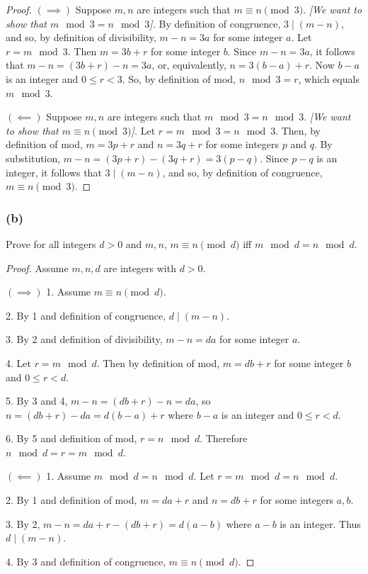 \documentclass[14pt]{extarticle}
\begin{document}
\begin{proof}
\(\bm{(\implies)}\) Suppose $m, n$ are integers such that \(m \equiv n \pmod 3\). {\it [We want to show that \(m \mod 
3 = n \mod 3\)].} By definition of congruence, \(3 \mid (m-n)\), and so, by definition of divisibility, \(m - n = 3a\) 
for some integer $a$. Let \(r = m \mod 3\). Then \(m = 3b + r\) for some integer $b$. Since \(m - n = 3a\), it follows 
that \(m - n = (3b + r) - n = 3a\), or, equivalently, \(n = 3(b - a) + r\). Now \(b - a\) is an integer and \(0 \leq r 
< 3\). So, by definition of mod, \(n \mod 3 = r\), which equals \(m \mod 3\). 

\(\bm{(\impliedby)}\) Suppose $m, n$ are integers such that \(m \mod 3 = n \mod 3\). {\it [We want to show that \(m 
\equiv n \pmod 3\)].} Let \(r = m \mod 3 = n \mod 3\). Then, by definition of mod, \(m = 3p + r\) and \(n = 3q + 
r\) for some integers $p$ and $q$. By substitution, \(m - n = (3p + r) - (3q + r) = 3(p - q)\). Since \(p - q\) is an 
integer, it follows that \(3 \mid (m - n)\), and so, by definition of congruence, \(m \equiv n \pmod 3\).
\end{proof}

\subsubsection{(b)}
Prove for all integers $d>0$ and $m,n$, \(m \equiv n \pmod d\) iff \(m \mod d = n \mod d\).

\begin{proof}
Assume $m,n,d$ are integers with $d > 0$.

\(\bm{(\implies)}\) 
1. Assume \(m \equiv n \pmod d\). 

2. By 1 and definition of congruence, \(d \mid (m-n)\).

3. By 2 and definition of divisibility, \(m-n = da\) for some integer $a$.

4. Let \(r = m \mod d\). Then by definition of mod, \(m = db + r\) for some integer $b$ and \(0 \leq r < d\).

5. By 3 and 4, \(m-n = (db+r) - n = da\), so \(n = (db+r) - da = d(b-a)+r\) where $b-a$ is an integer and \(0 \leq r < d\).

6. By 5 and definition of mod, \(r = n \mod d\). Therefore \(n \mod d = r = m \mod d\).

\(\bm{(\impliedby)}\)
1. Assume \(m \mod d = n \mod d\). Let \(r = m \mod d = n \mod d\).

2. By 1 and definition of mod, \(m = da+r\) and \(n = db+r\) for some integers $a,b$.

3. By 2, \(m-n = da+r - (db+r) = d(a-b)\) where $a-b$ is an integer. Thus \(d \mid (m-n)\).

4. By 3 and definition of congruence, \(m \equiv n \pmod d\).
\end{proof}
\end{document}
